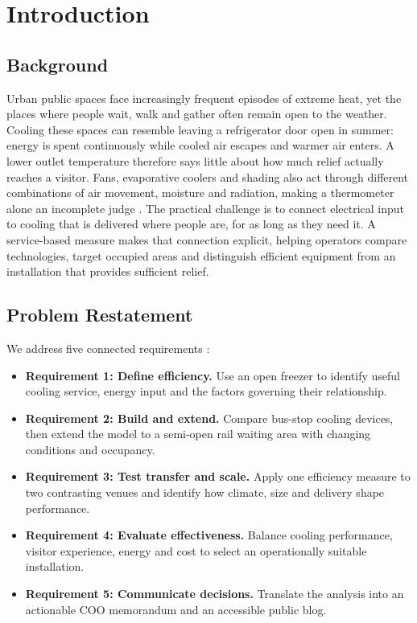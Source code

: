 \section{Introduction}
\label{sec:introduction}
\subsection{Background}
Urban public spaces face increasingly frequent episodes of extreme heat, yet the places where people wait, walk and gather often remain open to the weather. Cooling these spaces can resemble leaving a refrigerator door open in summer: energy is spent continuously while cooled air escapes and warmer air enters. A lower outlet temperature therefore says little about how much relief actually reaches a visitor. Fans, evaporative coolers and shading also act through different combinations of air movement, moisture and radiation, making a thermometer alone an incomplete judge \cite{fanguide,evapequip}. The practical challenge is to connect electrical input to cooling that is delivered where people are, for as long as they need it. A service-based measure makes that connection explicit, helping operators compare technologies, target occupied areas and distinguish efficient equipment from an installation that provides sufficient relief.

\subsection{Problem Restatement}
We address five connected requirements \cite{problem}:
\begin{itemize}[leftmargin=*,itemsep=2pt,topsep=3pt,parsep=0pt]
\item \textbf{Requirement 1: Define efficiency.} Use an open freezer to identify useful cooling service, energy input and the factors governing their relationship.
\item \textbf{Requirement 2: Build and extend.} Compare bus-stop cooling devices, then extend the model to a semi-open rail waiting area with changing conditions and occupancy.
\item \textbf{Requirement 3: Test transfer and scale.} Apply one efficiency measure to two contrasting venues and identify how climate, size and delivery shape performance.
\item \textbf{Requirement 4: Evaluate effectiveness.} Balance cooling performance, visitor experience, energy and cost to select an operationally suitable installation.
\item \textbf{Requirement 5: Communicate decisions.} Translate the analysis into an actionable COO memorandum and an accessible public blog.
\end{itemize}

